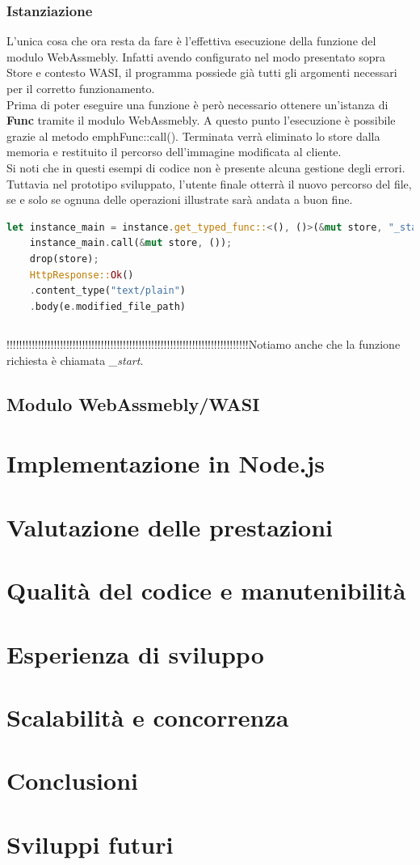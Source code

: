 \subsubsection{Istanziazione}
L'unica cosa che ora resta da fare è l'effettiva esecuzione della funzione del modulo WebAssmebly.
Infatti avendo configurato nel modo presentato sopra Store e contesto WASI, il programma possiede già tutti gli argomenti necessari per il corretto funzionamento.
\\Prima di poter eseguire una funzione è però necessario ottenere un'istanza di \textbf{Func} tramite il modulo WebAssmebly. 
A questo punto l'esecuzione è possibile grazie al metodo emph{Func::call()}. Terminata verrà eliminato lo store dalla memoria e restituito il percorso dell'immagine modificata al cliente.
\\Si noti che in questi esempi di codice non è presente alcuna gestione degli errori. Tuttavia nel prototipo sviluppato, l'utente finale otterrà il nuovo percorso del file, se e solo se ognuna delle operazioni illustrate sarà andata a buon fine.
\begin{lstlisting}[language=rust, showstringspaces=false]
    let instance_main = instance.get_typed_func::<(), ()>(&mut store, "_start");
    instance_main.call(&mut store, ());
    drop(store);
    HttpResponse::Ok()
    .content_type("text/plain")
    .body(e.modified_file_path)
\end{lstlisting}


\begin{lstlisting}[language=rust, showstringspaces=false]
\end{lstlisting}

!!!!!!!!!!!!!!!!!!!!!!!!!!!!!!!!!!!!!!!!!!!!!!!!!!!!!!!!!!!!!!!!!!!!!!!!!!!!!Notiamo anche che la funzione richiesta è chiamata \emph{\_start}.

\subsection{Modulo WebAssmebly/WASI}

\newpage
\section{Implementazione in Node.js}

\section{Valutazione delle prestazioni}
\section{Qualità del codice e manutenibilità}
\section{Esperienza di sviluppo}
\section{Scalabilità e concorrenza}
\section{Conclusioni}
\section{Sviluppi futuri}